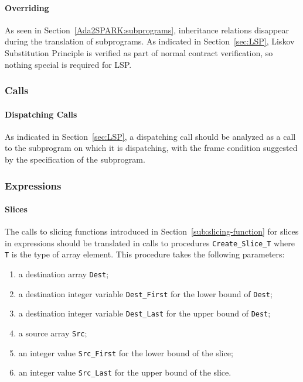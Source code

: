 \documentclass{article}
\begin{document}
\paragraph{Overriding}

As seen in Section~\ref{Ada2SPARK:subprograms}, inheritance relations disappear
during the translation of subprograms. As indicated in
Section~\ref{sec:LSP}, Liskov Substitution Principle is verified as part of
normal contract verification, so nothing special is required for LSP.

\subsubsection{Calls}

\paragraph{Dispatching Calls}

As indicated in Section~\ref{sec:LSP}, a dispatching call should be analyzed as
a call to the subprogram on which it is dispatching, with the frame condition
suggested by the specification of the subprogram.

\subsubsection{Expressions}

\paragraph{Slices}

The calls to slicing functions introduced in Section~\ref{sub:slicing-function}
for slices in expressions should be translated in calls to procedures
\verb|Create_Slice_T| where \verb|T| is the type of array element. This
procedure takes the following parameters:
\begin{enumerate}
\item a destination array \verb|Dest|;
\item a destination integer variable \verb|Dest_First| for the lower bound of
  \verb|Dest|;
\item a destination integer variable \verb|Dest_Last| for the upper bound of
  \verb|Dest|;
\item a source array \verb|Src|;
\item an integer value \verb|Src_First| for the lower bound of the slice;
\item an integer value \verb|Src_Last| for the upper bound of the slice.
\end{enumerate}
\end{document}
